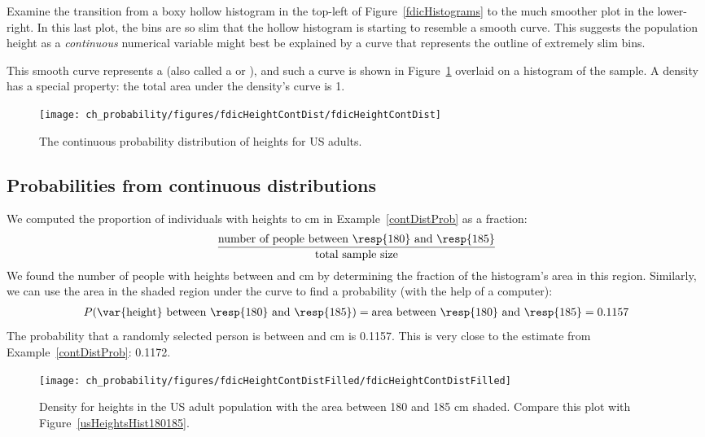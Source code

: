 Examine the transition from a boxy hollow histogram in the top-left of Figure~\ref{fdicHistograms} to the much smoother plot in the lower-right. In this last plot, the bins are so slim that the hollow histogram is starting to resemble a smooth curve. This suggests the population height as a \emph{continuous} numerical variable might best be explained by a curve that represents the outline of extremely slim bins.

This smooth curve represents a  (also called a  or ), and such a curve is shown in Figure~\ref{fdicHeightContDist} overlaid on a histogram of the sample. A density has a special property: the total area under the density's curve is 1. 

\begin{figure}[tbh]
\centering
\texttt{[image: ch\_probability/figures/fdicHeightContDist/fdicHeightContDist]}
\caption{The continuous probability distribution of heights for US adults.}
\label{fdicHeightContDist}
\end{figure}


\subsection{Probabilities from continuous distributions}

We computed the proportion of individuals with heights  to  cm in Example~\ref{contDistProb} as a fraction:
\begin{eqnarray*}
\frac{\text{number of people between \resp{180} and \resp{185}}}{\text{total sample size}}
\end{eqnarray*}
We found the number of people with heights between  and  cm by determining the fraction of the histogram's area in this region. Similarly, we can use the area in the shaded region under the curve to find a probability (with the help of a computer):
\begin{eqnarray*}
P(\text{\var{height} between \resp{180} and \resp{185}})
	= \text{area between \resp{180} and \resp{185}}
	= 0.1157
\end{eqnarray*}
The probability that a randomly selected person is between  and  cm is 0.1157. This is very close to the estimate from Example~\ref{contDistProb}: 0.1172. 

\begin{figure}
\centering
\texttt{[image: ch\_probability/figures/fdicHeightContDistFilled/fdicHeightContDistFilled]}
\caption{Density for heights in the US adult population with the area between 180 and 185 cm shaded. Compare this plot with Figure~\ref{usHeightsHist180185}.}
\label{fdicHeightContDistFilled}
\end{figure}

